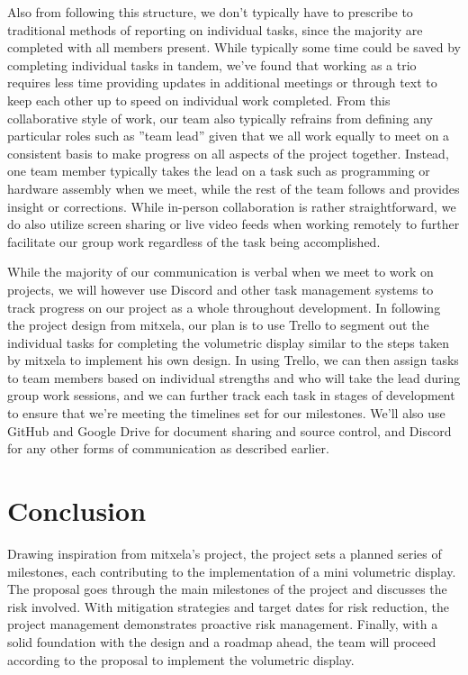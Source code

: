 \documentclass[11pt,journal]{IEEEtran}
\begin{document}
Also from following this structure, we don’t typically have to prescribe to traditional methods of reporting on individual tasks, since the majority are completed with all members present. While typically some time could be saved by completing individual tasks in tandem, we’ve found that working as a trio requires less time providing updates in additional meetings or through text to keep each other up to speed on individual work completed. From this collaborative style of work, our team also typically refrains from defining any particular roles such as ''team lead'' given that we all work equally to meet on a consistent basis to make progress on all aspects of the project together. Instead, one team member typically takes the lead on a task such as programming or hardware assembly when we meet, while the rest of the team follows and provides insight or corrections. While in-person collaboration is rather straightforward, we do also utilize screen sharing or live video feeds when working remotely to further facilitate our group work regardless of the task being accomplished.

While the majority of our communication is verbal when we meet to work on projects, we will however use Discord and other task management systems to track progress on our project as a whole throughout development. In following the project design from mitxela, our plan is to use Trello to segment out the individual tasks for completing the volumetric display similar to the steps taken by mitxela to implement his own design. In using Trello, we can then assign tasks to team members based on individual strengths and who will take the lead during group work sessions, and we can further track each task in stages of development to ensure that we’re meeting the timelines set for our milestones. We’ll also use GitHub and Google Drive for document sharing and source control, and Discord for any other forms of communication as described earlier.


 
\section{Conclusion}
Drawing inspiration from mitxela's project, the project sets a planned series of milestones, each contributing to the implementation of a mini volumetric display. The proposal goes through the main milestones of the project and discusses the risk involved. With mitigation strategies and target dates for risk reduction, the project management demonstrates proactive risk management. Finally, with a solid foundation with the design and a roadmap ahead, the team will proceed according to the proposal to implement the volumetric display.
\end{document}

